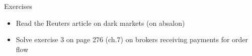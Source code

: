 \documentclass[english,10pt
,aspectratio=169
]{beamer}
\begin{document}
\begin{frame}{Exercises}
	\begin{itemize}
		\item Read the Reuters article on dark markets (on absalon)
		\item Solve exercise 3 on page 276 (ch.7) on brokers receiving payments for order flow
	\end{itemize}
\end{frame}
\end{document}
